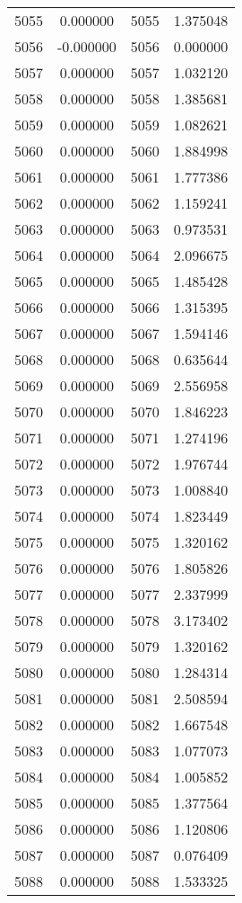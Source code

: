 \documentclass[12pt]{article}
\begin{document}
\begin{longtable}{@{}cccc@{}}
5055 & 0.000000 & 5055 & 1.375048 \\
5056 & -0.000000 & 5056 & 0.000000 \\
5057 & 0.000000 & 5057 & 1.032120 \\
5058 & 0.000000 & 5058 & 1.385681 \\
5059 & 0.000000 & 5059 & 1.082621 \\
5060 & 0.000000 & 5060 & 1.884998 \\
5061 & 0.000000 & 5061 & 1.777386 \\
5062 & 0.000000 & 5062 & 1.159241 \\
5063 & 0.000000 & 5063 & 0.973531 \\
5064 & 0.000000 & 5064 & 2.096675 \\
5065 & 0.000000 & 5065 & 1.485428 \\
5066 & 0.000000 & 5066 & 1.315395 \\
5067 & 0.000000 & 5067 & 1.594146 \\
5068 & 0.000000 & 5068 & 0.635644 \\
5069 & 0.000000 & 5069 & 2.556958 \\
5070 & 0.000000 & 5070 & 1.846223 \\
5071 & 0.000000 & 5071 & 1.274196 \\
5072 & 0.000000 & 5072 & 1.976744 \\
5073 & 0.000000 & 5073 & 1.008840 \\
5074 & 0.000000 & 5074 & 1.823449 \\
5075 & 0.000000 & 5075 & 1.320162 \\
5076 & 0.000000 & 5076 & 1.805826 \\
5077 & 0.000000 & 5077 & 2.337999 \\
5078 & 0.000000 & 5078 & 3.173402 \\
5079 & 0.000000 & 5079 & 1.320162 \\
5080 & 0.000000 & 5080 & 1.284314 \\
5081 & 0.000000 & 5081 & 2.508594 \\
5082 & 0.000000 & 5082 & 1.667548 \\
5083 & 0.000000 & 5083 & 1.077073 \\
5084 & 0.000000 & 5084 & 1.005852 \\
5085 & 0.000000 & 5085 & 1.377564 \\
5086 & 0.000000 & 5086 & 1.120806 \\
5087 & 0.000000 & 5087 & 0.076409 \\
5088 & 0.000000 & 5088 & 1.533325 \\

\end{longtable}
\end{document}
